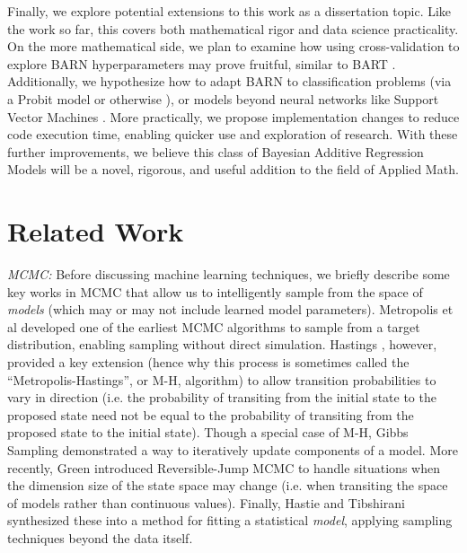 \documentclass[12pt]{article}
\begin{document}
Finally, we explore potential extensions to this work as a dissertation topic.  Like the work so far, this covers both mathematical rigor and data science practicality.  On the more mathematical side, we plan to examine how using cross-validation to explore BARN hyperparameters may prove fruitful, similar to BART \cite{chipman2010bart}.  Additionally, we hypothesize how to adapt BARN to classification problems (via a Probit model or otherwise \cite{mccullagh1989generalized}), or models beyond neural networks like Support Vector Machines \cite{hastie2009elements}.  More practically, we propose implementation changes to reduce code execution time, enabling quicker use and exploration of research.  With these further improvements, we believe this class of Bayesian Additive Regression Models will be a novel, rigorous, and useful addition to the field of Applied Math.

\section{Related Work}\label{sec:related}

\emph{MCMC:} Before discussing machine learning techniques, we briefly describe some key works in MCMC that allow us to intelligently sample from the space of \emph{models} (which may or may not include learned model parameters).  Metropolis et al \cite{metropolis1953equation} developed one of the earliest MCMC algorithms to sample from a target distribution, enabling sampling without direct simulation.  Hastings \cite{hastings1970monte}, however, provided a key extension (hence why this process is sometimes called the ``Metropolis-Hastings'', or M-H, algorithm) to allow transition probabilities to vary in direction (i.e. the probability of transiting from the initial state to the proposed state need not be equal to the probability of transiting from the proposed state to the initial state).  Though a special case of M-H, Gibbs Sampling \cite{geman1984stochastic} demonstrated a way to iteratively update components of a model.  More recently, Green \cite{green1995reversible} introduced Reversible-Jump MCMC to handle situations when the dimension size of the state space may change (i.e. when transiting the space of models rather than continuous values).  Finally, Hastie and Tibshirani \cite{hastie2000bayesian} synthesized these into a method for fitting a statistical \emph{model}, applying sampling techniques beyond the data itself.
\end{document}
